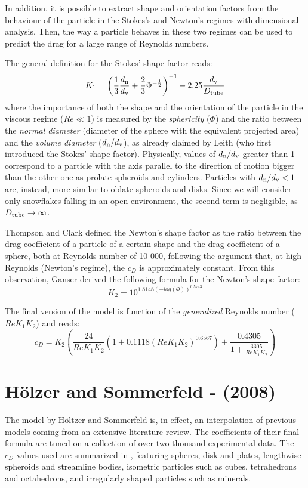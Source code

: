 		In addition, it is possible to extract shape and orientation factors	from the behaviour of the particle in the Stokes’s and Newton’s regimes with dimensional analysis. Then, the way a particle behaves in these two regimes can be used to predict the drag for a large range of Reynolds numbers.
		
		The general definition for the Stokes' shape factor reads:
		\begin{equation}
			K_1 = \left( \frac{1}{3} \frac{d_{\textup{n}}}{d_{\textup{v}}} + \frac{2}{3} \Phi^{-\frac{1}{2}} \right)^{-1} -2.25 \frac{d_{\textup{v}}}{D_{\textup{tube}}} 
		\end{equation}
		where the importance of both the shape and the orientation of the particle in the viscous regime ($ Re \ll 1 $) is measured by the \textit{sphericity} ($ \Phi $) and the ratio between the \textit{normal diameter} (diameter of the sphere with the equivalent projected area) and the \textit{volume diameter} ($ d_{\textup{n}} / d_{\textup{v}} $), as already claimed by Leith \cite{Leith-1987} (who first introduced the Stokes' shape factor). Physically, values of $ d_{\textup{n}} / d_{\textup{v}} $ greater than 1 correspond to a particle with the axis parallel to the direction of motion bigger than the other one as prolate spheroids and cylinders. Particles with $ d_{\textup{n}} / d_{\textup{v}} < 1 $ are, instead, more similar to oblate spheroids and disks.
		Since we will consider only snowflakes falling in an open environment, the second term is negligible, as $ D_{\textup{tube}} \rightarrow \infty $.
		
		Thompson and Clark \cite{ThompsonClark-1991} defined the Newton's shape factor as the ratio between the drag coefficient of a particle of a certain shape and the drag coefficient of a sphere, both at Reynolds number of 10 000, following the argument that, at high Reynolds (Newton's regime), the $ c_D $ is approximately constant.
		From this observation, Ganser derived the following formula for the Newton's shape factor:
		\begin{equation}
			K_2 = 10^{1.8148 (-log(\Phi))^{0.5743}}
		\end{equation}
		
		The final version of the model is function of the \textit{generalized} Reynolds number ($ Re K_1 K_2 $) and reads:
		\begin{equation}
			c_D = K_2 \left( \frac{24}{Re K_1 K_2} (1 + 0.1118 (Re K_1 K_2)^{0.6567}) + \frac{0.4305}{1 + \frac{3305}{Re K_1 K_2}}\right) 
		\end{equation}
	
				
	\section{H\"{o}lzer and Sommerfeld - (2008)}
		The model by H\"{o}ltzer and Sommerfeld \cite{HoltzerSommerfeld-2008} is, in effect, an interpolation of previous models coming from an extensive literature review. The coefficients of their final formula are tuned on a collection of over two thousand experimental data. The $ c_D $ values used are summarized in , featuring spheres, disk and plates, lengthwise spheroids and streamline bodies, isometric particles such as cubes, tetrahedrons and octahedrons, and irregularly shaped particles such as minerals.
		
